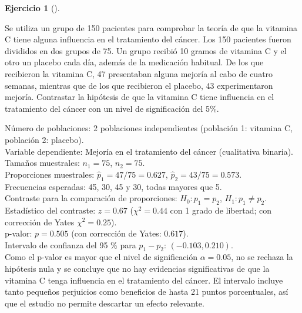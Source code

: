 \documentclass[
  spanish,
  a4paper,
]{scrreport}
\theoremstyle{definition}
\newtheorem{exercise}{Ejercicio}[chapter]
\theoremstyle{remark}
\begin{document}
\begin{exercise}[]\protect\hypertarget{exr-contraste-comparacion-proporciones-vitamina-c}{}\label{exr-contraste-comparacion-proporciones-vitamina-c}

Se utiliza un grupo de 150 pacientes para comprobar la teoría de que la
vitamina C tiene alguna influencia en el tratamiento del cáncer. Los 150
pacientes fueron divididos en dos grupos de 75. Un grupo recibió 10
gramos de vitamina C y el otro un placebo cada día, además de la
medicación habitual. De los que recibieron la vitamina C, 47 presentaban
alguna mejoría al cabo de cuatro semanas, mientras que de los que
recibieron el placebo, 43 experimentaron mejoría. Contrastar la
hipótesis de que la vitamina C tiene influencia en el tratamiento del
cáncer con un nivel de significación del 5\%.

\end{exercise}

\begin{tcolorbox}[enhanced jigsaw, arc=.35mm, bottomrule=.15mm, bottomtitle=1mm, breakable, colback=white, colbacktitle=quarto-callout-tip-color!10!white, colframe=quarto-callout-tip-color-frame, coltitle=black, left=2mm, leftrule=.75mm, opacityback=0, opacitybacktitle=0.6, rightrule=.15mm, title=\textcolor{quarto-callout-tip-color}{\faLightbulb}\hspace{0.5em}{Solución}, titlerule=0mm, toprule=.15mm, toptitle=1mm]

Número de poblaciones: 2 poblaciones independientes (población 1:
vitamina C, población 2: placebo).\\
Variable dependiente: Mejoría en el tratamiento del cáncer (cualitativa
binaria).\\
Tamaños muestrales: \(n_1=75\), \(n_2=75\).\\
Proporciones muestrales: \(\hat p_1=47/75=0.627\),
\(\hat p_2=43/75=0.573\).\\
Frecuencias esperadas: 45, 30, 45 y 30, todas mayores que 5.\\
Contraste para la comparación de proporciones: \(H_0:p_1=p_2\),
\(H_1:p_1\neq p_2\).\\
Estadístico del contraste: \(z=0.67\) (\(\chi^2=0.44\) con 1 grado de
libertad; con corrección de Yates \(\chi^2=0.25\)).\\
p-valor: \(p=0.505\) (con corrección de Yates: \(0.617\)).\\
Intervalo de confianza del 95 \% para \(p_1-p_2\):
\((-0.103, 0.210)\).\\
Como el p-valor es mayor que el nivel de significación \(\alpha=0.05\),
no se rechaza la hipótesis nula y se concluye que no hay evidencias
significativas de que la vitamina C tenga influencia en el tratamiento
del cáncer. El intervalo incluye tanto pequeños perjuicios como
beneficios de hasta 21 puntos porcentuales, así que el estudio no
permite descartar un efecto relevante.

\end{tcolorbox}
\end{document}
